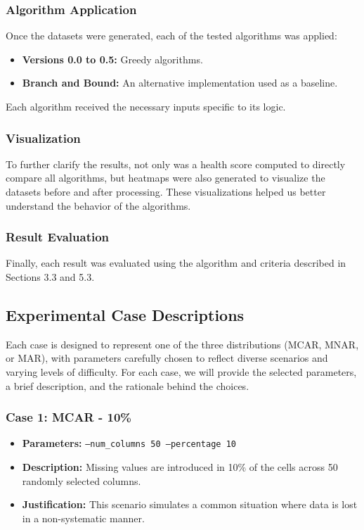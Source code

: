 \documentclass[a4paper,12pt]{article}
\begin{document}
\subsubsection{Algorithm Application}
Once the datasets were generated, each of the tested algorithms was applied:
\begin{itemize}
    \item \textbf{Versions 0.0 to 0.5:} Greedy algorithms.
    \item \textbf{Branch and Bound:} An alternative implementation used as a baseline.
\end{itemize}
Each algorithm received the necessary inputs specific to its logic.

\subsubsection{Visualization}
To further clarify the results, not only was a health score computed to directly compare all algorithms, but heatmaps were also generated to visualize the datasets before and after processing. These visualizations helped us better understand the behavior of the algorithms.

\subsubsection{Result Evaluation}
Finally, each result was evaluated using the algorithm and criteria described in Sections 3.3 and 5.3.

\subsection{Experimental Case Descriptions}
Each case is designed to represent one of the three distributions (MCAR, MNAR, or MAR), with parameters carefully chosen to reflect diverse scenarios and varying levels of difficulty. For each case, we will provide the selected parameters, a brief description, and the rationale behind the choices. 
\subsubsection{Case 1: MCAR - 10\%}
\begin{itemize}
    \item \textbf{Parameters:} \texttt{--num\_columns 50 --percentage 10}
    \item \textbf{Description:} Missing values are introduced in 10\% of the cells across 50 randomly selected columns.
    \item \textbf{Justification:} This scenario simulates a common situation where data is lost in a non-systematic manner.
\end{itemize}
\end{document}
